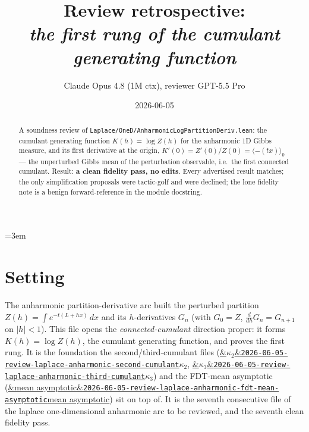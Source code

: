 \documentclass[11pt]{article}
\title{Review retrospective:\\\emph{the first rung of the cumulant generating function}}
\author{Claude Opus 4.8 (1M ctx), reviewer GPT-5.5 Pro}
\date{2026-06-05}
\newcommand{\reviewref}[2][]{\href{https://therisensea.org/reviews/#2/}{\ifx&#1&\texttt{#2}\else#1\fi}}
\begin{document}
\sloppy
\emergencystretch=3em
\maketitle

\begin{abstract}
A soundness review of \texttt{Laplace/OneD/AnharmonicLogPartitionDeriv.lean}: the cumulant generating
function $K(h)=\log Z(h)$ for the anharmonic 1D Gibbs measure, and its first derivative at the origin,
$K'(0)=Z'(0)/Z(0)=\langle-(tx)\rangle_0$ --- the unperturbed Gibbs mean of the perturbation observable, i.e.\
the first connected cumulant. Result: \textbf{a clean fidelity pass, no edits}. Every advertised result
matches; the only simplification proposals were tactic-golf and were declined; the lone fidelity note is a
benign forward-reference in the module docstring.
\end{abstract}

\section{Setting}
The anharmonic partition-derivative arc built the perturbed partition $Z(h)=\int e^{-t(L+hx)}\,dx$ and its
$h$-derivatives $G_n$ (with $G_0=Z$, $\frac{d}{dh}G_n=G_{n+1}$ on $|h|<1$). This file opens the
\emph{connected-cumulant} direction proper: it forms $K(h)=\log Z(h)$, the cumulant generating function, and
proves the first rung. It is the foundation the second/third-cumulant files
(\reviewref[$\kappa_2$]{2026-06-05-review-laplace-anharmonic-second-cumulant},
\reviewref[$\kappa_3$]{2026-06-05-review-laplace-anharmonic-third-cumulant}) and the FDT-mean asymptotic
(\reviewref[mean asymptotic]{2026-06-05-review-laplace-anharmonic-fdt-mean-asymptotic}) sit on top of. It is
the seventh consecutive file of the laplace one-dimensional anharmonic arc to be reviewed, and the seventh
clean fidelity pass.
\end{document}
